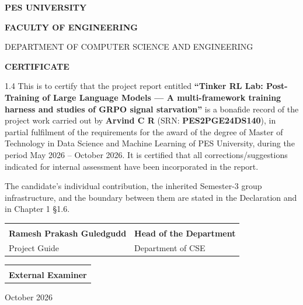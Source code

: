 \begin{titlepage}
\centering
\thispagestyle{empty}
\vspace*{0.1in}
{\Large\bfseries PES UNIVERSITY\par}
\vspace{0.2in}
{\large\bfseries FACULTY OF ENGINEERING\par}
{\normalsize DEPARTMENT OF COMPUTER SCIENCE AND ENGINEERING\par}
\vspace{0.35in}
{\Large\bfseries CERTIFICATE\par}
\vspace{0.5in}
\begin{spacing}{1.4}
\noindent This is to certify that the project report entitled
\textbf{``Tinker RL Lab: Post-Training of Large Language Models --- A
multi-framework training harness and studies of GRPO signal starvation''} is a
bonafide record of the project work carried out by
\textbf{Arvind C R} (SRN: \textbf{PES2PGE24DS140}), in partial fulfilment of
the requirements for the award of the degree of Master of Technology in
Data Science and Machine Learning of PES University, during the period
May 2026 -- October 2026. It is certified that all corrections/suggestions
indicated for internal assessment have been incorporated in the report.

\vspace{0.3in}
The candidate's individual contribution, the inherited Semester-3 group
infrastructure, and the boundary between them are stated in the Declaration
and in Chapter 1 \S1.6.
\end{spacing}
\vspace{0.4in}
\noindent\begin{tabular}{@{}p{2.4in}p{2.4in}@{}}
\dotfill & \dotfill \\
\textbf{Ramesh Prakash Guledgudd} & \textbf{Head of the Department} \\
Project Guide & Department of CSE \\
\end{tabular}
\vspace{0.3in}
\noindent\begin{tabular}{@{}p{2.4in}@{}}
\dotfill \\
\textbf{External Examiner} \\
\end{tabular}
\vfill
{\normalsize October 2026\par}
\end{titlepage}

